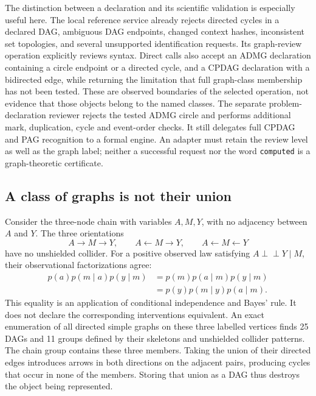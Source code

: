 The distinction between a declaration and its scientific validation is
especially useful here. The local reference service already rejects directed
cycles in a declared DAG, ambiguous DAG endpoints, changed context hashes,
inconsistent set topologies, and several unsupported identification requests.
Its graph-review operation explicitly reviews syntax. Direct calls also accept
an ADMG declaration containing a circle endpoint or a directed cycle, and a
CPDAG declaration with a bidirected edge, while returning the limitation that
full graph-class membership has not been tested. These are observed boundaries
of the selected operation, not evidence that those objects belong to the named
classes. The separate problem-declaration reviewer rejects the tested ADMG
circle and performs additional mark, duplication, cycle and event-order checks.
It still delegates full CPDAG and PAG recognition to a formal engine. An adapter
must retain the review level as well as the graph label; neither a successful
request nor the word \texttt{computed} is a graph-theoretic certificate.
\citep{exec16_topology_runtime}

\subsection{A class of graphs is not their union}

Consider the three-node chain with variables \(A,M,Y\), with no adjacency
between \(A\) and \(Y\). The three orientations
\[
 A\longrightarrow M\longrightarrow Y,\qquad
 A\longleftarrow M\longrightarrow Y,\qquad
 A\longleftarrow M\longleftarrow Y
\]
have no unshielded collider. For a positive observed law satisfying
\(A\mathrel{\perp\!\!\!\perp}Y\mid M\), their observational factorizations agree:
\begin{align*}
 p(a)p(m\mid a)p(y\mid m)
 &=p(m)p(a\mid m)p(y\mid m)\\
 &=p(y)p(m\mid y)p(a\mid m).
\end{align*}
This equality is an application of conditional independence and Bayes' rule.
It does not declare the corresponding interventions equivalent. An exact
enumeration of all directed simple graphs on these three labelled vertices
finds 25 DAGs and 11 groups defined by their skeletons and unshielded collider
patterns. The chain group contains these three members. Taking the union of
their directed edges introduces arrows in both directions on the adjacent
pairs, producing cycles that occur in none of the members. Storing that union
as a DAG thus destroys the object being represented.
\citep{exec16_topology_exact}

